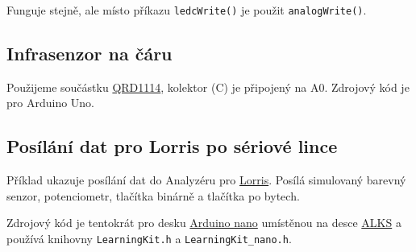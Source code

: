 
 
Funguje stejně, ale místo příkazu {\tt ledcWrite()} je použit {\tt analogWrite()}.

\subsection{Infrasenzor na čáru} \label{prog:qrd1114}

Použijeme součástku \hyperref[qrd1114]{QRD1114}, kolektor (C) je připojený na A0. Zdrojový kód je pro Arduino Uno. 



\subsection{Posílání dat pro Lorris po sériové lince} \label{prog:lorris}

Příklad ukazuje posílání dat do Analyzéru pro \hyperref[lorris]{Lorris}.
 Posílá simulovaný barevný senzor, potenciometr, tlačítka binárně a tlačítka po bytech. 

Zdrojový kód je tentokrát pro desku \hyperref[alks:nano]{Arduino nano}
 umístěnou na desce \hyperref[alks]{ALKS} a používá knihovny
{\tt LearningKit.h}  a  {\tt LearningKit\_nano.h}. 



